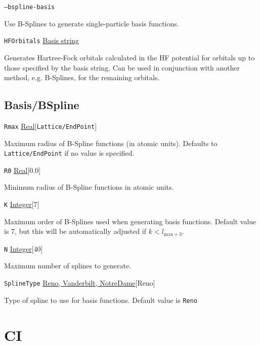 \documentclass{report}
\begin{document}
\texttt{--bspline-basis} 
\begin{adjustwidth}{1cm}{}
Use B-Splines to generate single-particle basis functions.
\end{adjustwidth}

\texttt{HFOrbitals} \uline{Basis string}
\begin{adjustwidth}{1cm}{}
Generates Hartree-Fock orbitals calculated in the HF potential for orbitals up to those specified by the basis string. Can be used in conjunction with another method, e.g. B-Splines, for the remaining orbitals.
\end{adjustwidth}

\subsection{Basis/BSpline}

\texttt{Rmax} \uline{Real}[\texttt{Lattice/EndPoint}]
\begin{adjustwidth}{1cm}{}
Maximum radius of B-Spline functions (in atomic units). Defaults to \texttt{Lattice/EndPoint} if no 
value is specified.
\end{adjustwidth}

\texttt{R0} \uline{Real}[0.0]
\begin{adjustwidth}{1cm}{}
Minimum radius of B-Spline functions in atomic units. 
\end{adjustwidth}

\texttt{K} \uline{Integer}[7]
\begin{adjustwidth}{1cm}{}
Maximum order of B-Splines used when generating basis functions. Default value is 7, but this will be
automatically adjusted if $k < l_{\mathrm{max} + 3}$.
\end{adjustwidth}

\texttt{N} \uline{Integer}[40]
\begin{adjustwidth}{1cm}{}
Maximum number of splines to generate.
\end{adjustwidth}

\texttt{SplineType} \uline{Reno, Vanderbilt, NotreDame}[Reno]
\begin{adjustwidth}{1cm}{}
Type of spline to use for basis functions. Default value is \texttt{Reno}
\end{adjustwidth}

\section{CI}
\end{document}
